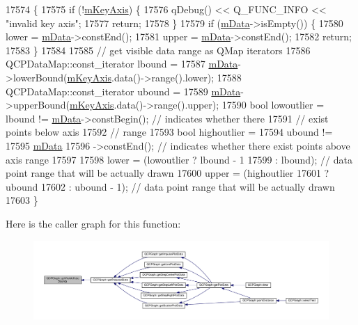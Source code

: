 \begin{DoxyCode}
17574                                                                            \{
17575   \textcolor{keywordflow}{if} (!\hyperlink{class_q_c_p_abstract_plottable_a426f42e254d0f8ce5436a868c61a6827}{mKeyAxis}) \{
17576     qDebug() << Q\_FUNC\_INFO << \textcolor{stringliteral}{"invalid key axis"};
17577     \textcolor{keywordflow}{return};
17578   \}
17579   \textcolor{keywordflow}{if} (\hyperlink{class_q_c_p_graph_a8457c840f69a0ac49f61d30a509c5d08}{mData}->isEmpty()) \{
17580     lower = \hyperlink{class_q_c_p_graph_a8457c840f69a0ac49f61d30a509c5d08}{mData}->constEnd();
17581     upper = \hyperlink{class_q_c_p_graph_a8457c840f69a0ac49f61d30a509c5d08}{mData}->constEnd();
17582     \textcolor{keywordflow}{return};
17583   \}
17584 
17585   \textcolor{comment}{// get visible data range as QMap iterators}
17586   QCPDataMap::const\_iterator lbound =
17587       \hyperlink{class_q_c_p_graph_a8457c840f69a0ac49f61d30a509c5d08}{mData}->lowerBound(\hyperlink{class_q_c_p_abstract_plottable_a426f42e254d0f8ce5436a868c61a6827}{mKeyAxis}.data()->range().lower);
17588   QCPDataMap::const\_iterator ubound =
17589       \hyperlink{class_q_c_p_graph_a8457c840f69a0ac49f61d30a509c5d08}{mData}->upperBound(\hyperlink{class_q_c_p_abstract_plottable_a426f42e254d0f8ce5436a868c61a6827}{mKeyAxis}.data()->range().upper);
17590   \textcolor{keywordtype}{bool} lowoutlier = lbound != \hyperlink{class_q_c_p_graph_a8457c840f69a0ac49f61d30a509c5d08}{mData}->constBegin(); \textcolor{comment}{// indicates whether there}
17591                                                    \textcolor{comment}{// exist points below axis}
17592                                                    \textcolor{comment}{// range}
17593   \textcolor{keywordtype}{bool} highoutlier =
17594       ubound !=
17595       \hyperlink{class_q_c_p_graph_a8457c840f69a0ac49f61d30a509c5d08}{mData}
17596           ->constEnd(); \textcolor{comment}{// indicates whether there exist points above axis range}
17597 
17598   lower = (lowoutlier ? lbound - 1
17599                       : lbound); \textcolor{comment}{// data point range that will be actually drawn}
17600   upper = (highoutlier
17601                ? ubound
17602                : ubound - 1); \textcolor{comment}{// data point range that will be actually drawn}
17603 \}
\end{DoxyCode}


Here is the caller graph for this function\+:\nopagebreak
\begin{figure}[H]
\begin{center}
\leavevmode
\includegraphics[width=350pt]{class_q_c_p_graph_a6a317cb14a83dae0841c7041a63d6d9d_icgraph}
\end{center}
\end{figure}


